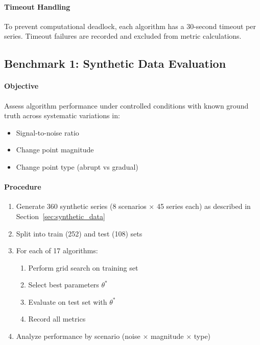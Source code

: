 \paragraph{Timeout Handling}

To prevent computational deadlock, each algorithm has a 30-second timeout per series. Timeout failures are recorded and excluded from metric calculations.

\subsection{Benchmark 1: Synthetic Data Evaluation}
\label{sec:benchmark1}

\paragraph{Objective}

Assess algorithm performance under controlled conditions with known ground truth across systematic variations in:
\begin{itemize}
    \item Signal-to-noise ratio
    \item Change point magnitude
    \item Change point type (abrupt vs gradual)
\end{itemize}

\paragraph{Procedure}

\begin{enumerate}
    \item Generate 360 synthetic series (8 scenarios $\times$ 45 series each) as described in Section~\ref{sec:synthetic_data}
    \item Split into train (252) and test (108) sets
    \item For each of 17 algorithms:
    \begin{enumerate}
        \item Perform grid search on training set
        \item Select best parameters $\theta^*$
        \item Evaluate on test set with $\theta^*$
        \item Record all metrics
    \end{enumerate}
    \item Analyze performance by scenario (noise $\times$ magnitude $\times$ type)
\end{enumerate}

